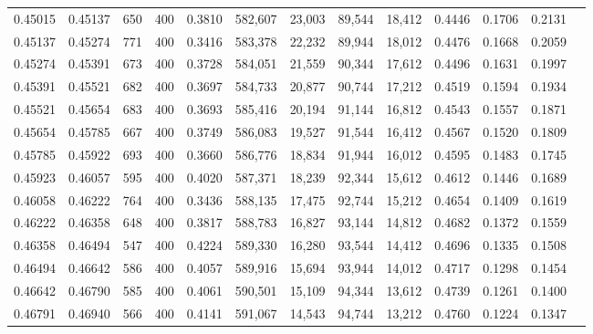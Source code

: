 \begin{tabular}{rrrrrrrrrrrrr}
0.45015 & 0.45137 &    650 & 400 &                                     0.3810 & 582,607 &  23,003 &  89,544 &  18,412 & 0.4446 & 0.1706 & 0.2131 \\
0.45137 & 0.45274 &    771 & 400 &                                     0.3416 & 583,378 &  22,232 &  89,944 &  18,012 & 0.4476 & 0.1668 & 0.2059 \\
0.45274 & 0.45391 &    673 & 400 &                                     0.3728 & 584,051 &  21,559 &  90,344 &  17,612 & 0.4496 & 0.1631 & 0.1997 \\
0.45391 & 0.45521 &    682 & 400 &                                     0.3697 & 584,733 &  20,877 &  90,744 &  17,212 & 0.4519 & 0.1594 & 0.1934 \\
0.45521 & 0.45654 &    683 & 400 &                                     0.3693 & 585,416 &  20,194 &  91,144 &  16,812 & 0.4543 & 0.1557 & 0.1871 \\
0.45654 & 0.45785 &    667 & 400 &                                     0.3749 & 586,083 &  19,527 &  91,544 &  16,412 & 0.4567 & 0.1520 & 0.1809 \\
0.45785 & 0.45922 &    693 & 400 &                                     0.3660 & 586,776 &  18,834 &  91,944 &  16,012 & 0.4595 & 0.1483 & 0.1745 \\
0.45923 & 0.46057 &    595 & 400 &                                     0.4020 & 587,371 &  18,239 &  92,344 &  15,612 & 0.4612 & 0.1446 & 0.1689 \\
0.46058 & 0.46222 &    764 & 400 &                                     0.3436 & 588,135 &  17,475 &  92,744 &  15,212 & 0.4654 & 0.1409 & 0.1619 \\
0.46222 & 0.46358 &    648 & 400 &                                     0.3817 & 588,783 &  16,827 &  93,144 &  14,812 & 0.4682 & 0.1372 & 0.1559 \\
0.46358 & 0.46494 &    547 & 400 &                                     0.4224 & 589,330 &  16,280 &  93,544 &  14,412 & 0.4696 & 0.1335 & 0.1508 \\
0.46494 & 0.46642 &    586 & 400 &                                     0.4057 & 589,916 &  15,694 &  93,944 &  14,012 & 0.4717 & 0.1298 & 0.1454 \\
0.46642 & 0.46790 &    585 & 400 &                                     0.4061 & 590,501 &  15,109 &  94,344 &  13,612 & 0.4739 & 0.1261 & 0.1400 \\
0.46791 & 0.46940 &    566 & 400 &                                     0.4141 & 591,067 &  14,543 &  94,744 &  13,212 & 0.4760 & 0.1224 & 0.1347 \\

\end{tabular}
